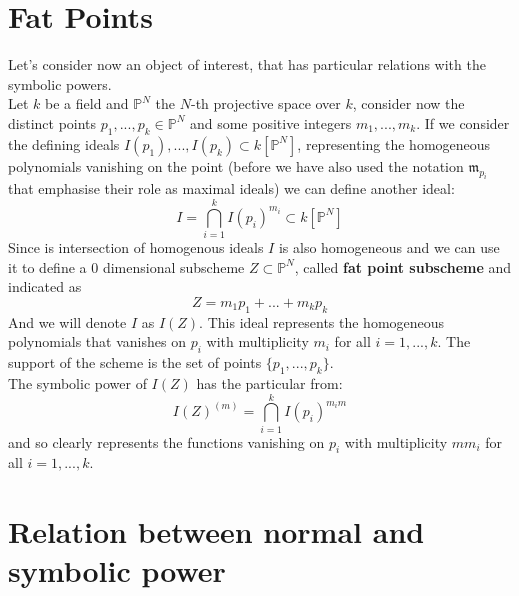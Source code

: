 \documentclass[notitlepage, a4]{book}
\theoremstyle{plain}
\theoremstyle{remark}
\theoremstyle{definition}
\newcommand{\PP}{\mathbb{P}}
\newcommand{\mm}{\mathfrak{m}}
\newcounter{que}
\begin{document}
\section{Fat Points}

Let's consider now an object of interest, that has particular relations with the symbolic powers.\\
Let $ k $ be a field and $ \PP^N$ the $ N $-th projective space over $ k $, consider now the distinct points \linebreak
$ p_1, ... ,p_k \in  \PP^N$ and some positive integers $ m_1 , ... ,m_k $. If we consider the defining ideals $ I(p_1), ... , I(p_k)  \subset k [\PP^N]$, representing the homogeneous polynomials vanishing on the point (before we have also used the notation $ \mm_{p_i}$ that emphasise their role as maximal ideals) we can define another ideal:
\begin{equation}\label{eq:fat_pt}
	I = \bigcap_{i=1}^k I(p_i)^{m_i} \subset k [\PP^N]
\end{equation}
Since is intersection of homogenous ideals $ I $ is also homogeneous and we can use it to define a $ 0 $ dimensional subscheme $ Z \subset \PP^N $, called \textbf{fat point subscheme} and indicated as 
\[
Z = m_1 p_1 + ... +  m_k p_k
\]
And we will denote $ I $ as $ I(Z) $. This ideal represents the homogeneous polynomials that vanishes on $ p_i $ with multiplicity $ m_i $ for all $ i = 1, ... , k $. The support of the scheme is the set of points $ \{ p_1 , ... , p_k\} $.\\
The symbolic power of $ I(Z) $ has the particular from:
\[
I(Z)^{(m)} = \bigcap_{i=1}^k I(p_i)^{m_im}
\]
and so clearly represents the functions vanishing on $ p_i $ with multiplicity $ mm_i $ for all $ i = 1, ... , k $. 


%



\section{Relation between normal and symbolic power}
\end{document}
